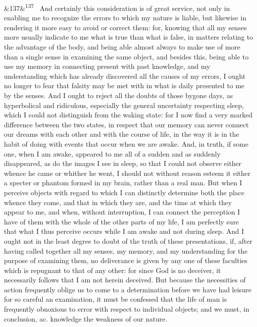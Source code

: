 \documentclass[12pt]{article}
\newcommand{\para}[1][]{\par\noindent\ifx&#1&\else\textsuperscript{\footnotesize #1}~\fi}
\begin{document}
\para[137] And certainly this consideration is of great service, not only in enabling me to recognize the errors to which my nature is liable, but likewise in rendering it more easy to avoid or correct them: for, knowing that all my senses more usually indicate to me what is true than what is false, in matters relating to the advantage of the body, and being able almost always to make use of more than a single sense in examining the same object, and besides this, being able to use my memory in connecting present with past knowledge, and my understanding which has already discovered all the causes of my errors, I ought no longer to fear that falsity may be met with in what is daily presented to me by the senses. And I ought to reject all the doubts of those bygone days, as hyperbolical and ridiculous, especially the general uncertainty respecting sleep, which I could not distinguish from the waking state: for I now find a very marked difference between the two states, in respect that our memory can never connect our dreams with each other and with the course of life, in the way it is in the habit of doing with events that occur when we are awake. And, in truth, if some one, when I am awake, appeared to me all of a sudden and as suddenly disappeared, as do the images I see in sleep, so that I could not observe either whence he came or whither he went, I should not without reason esteem it either a specter or phantom formed in my brain, rather than a real man. But when I perceive objects with regard to which I can distinctly determine both the place whence they come, and that in which they are, and the time at which they appear to me, and when, without interruption, I can connect the perception I have of them with the whole of the other parts of my life, I am perfectly sure that what I thus perceive occurs while I am awake and not during sleep. And I ought not in the least degree to doubt of the truth of these presentations, if, after having called together all my senses, my memory, and my understanding for the purpose of examining them, no deliverance is given by any one of these faculties which is repugnant to that of any other: for since God is no deceiver, it necessarily follows that I am not herein deceived. But because the necessities of action frequently oblige us to come to a determination before we have had leisure for so careful an examination, it must be confessed that the life of man is frequently obnoxious to error with respect to individual objects; and we must, in conclusion, ac. knowledge the weakness of our nature.

\end{document}

